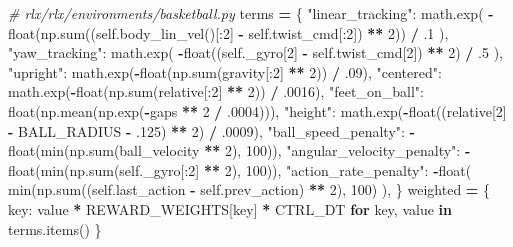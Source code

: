 \documentclass[
  american,
  11pt,
  letterpaper,
]{article}
\newenvironment{Shaded}{\begin{snugshade}}{\end{snugshade}}
\newcommand{\BuiltInTok}[1]{#1}
\newcommand{\CommentTok}[1]{\textcolor[rgb]{0.56,0.35,0.01}{\textit{#1}}}
\newcommand{\ControlFlowTok}[1]{\textcolor[rgb]{0.13,0.29,0.53}{\textbf{#1}}}
\newcommand{\DecValTok}[1]{\textcolor[rgb]{0.00,0.00,0.81}{#1}}
\newcommand{\FloatTok}[1]{\textcolor[rgb]{0.00,0.00,0.81}{#1}}
\newcommand{\KeywordTok}[1]{\textcolor[rgb]{0.13,0.29,0.53}{\textbf{#1}}}
\newcommand{\NormalTok}[1]{#1}
\newcommand{\OperatorTok}[1]{\textcolor[rgb]{0.81,0.36,0.00}{\textbf{#1}}}
\newcommand{\StringTok}[1]{\textcolor[rgb]{0.31,0.60,0.02}{#1}}
\newcommand{\VariableTok}[1]{\textcolor[rgb]{0.00,0.00,0.00}{#1}}
\renewenvironment{Shaded}{\par\smallskip}{\par\smallskip}
\begin{document}
\begin{Shaded}
\begin{Highlighting}[]
\CommentTok{\# rlx/rlx/environments/basketball.py}
\NormalTok{terms }\OperatorTok{=}\NormalTok{ \{}
    \StringTok{"linear\_tracking"}\NormalTok{: math.exp(}
        \OperatorTok{{-}}\BuiltInTok{float}\NormalTok{(np.}\BuiltInTok{sum}\NormalTok{((}\VariableTok{self}\NormalTok{.body\_lin\_vel()[:}\DecValTok{2}\NormalTok{] }\OperatorTok{{-}} \VariableTok{self}\NormalTok{.twist\_cmd[:}\DecValTok{2}\NormalTok{]) }\OperatorTok{**} \DecValTok{2}\NormalTok{)) }\OperatorTok{/} \FloatTok{.1}
\NormalTok{    ),}
    \StringTok{"yaw\_tracking"}\NormalTok{: math.exp(}
        \OperatorTok{{-}}\BuiltInTok{float}\NormalTok{((}\VariableTok{self}\NormalTok{.\_gyro[}\DecValTok{2}\NormalTok{] }\OperatorTok{{-}} \VariableTok{self}\NormalTok{.twist\_cmd[}\DecValTok{2}\NormalTok{]) }\OperatorTok{**} \DecValTok{2}\NormalTok{) }\OperatorTok{/} \FloatTok{.5}
\NormalTok{    ),}
    \StringTok{"upright"}\NormalTok{: math.exp(}\OperatorTok{{-}}\BuiltInTok{float}\NormalTok{(np.}\BuiltInTok{sum}\NormalTok{(gravity[:}\DecValTok{2}\NormalTok{] }\OperatorTok{**} \DecValTok{2}\NormalTok{)) }\OperatorTok{/} \FloatTok{.09}\NormalTok{),}
    \StringTok{"centered"}\NormalTok{: math.exp(}\OperatorTok{{-}}\BuiltInTok{float}\NormalTok{(np.}\BuiltInTok{sum}\NormalTok{(relative[:}\DecValTok{2}\NormalTok{] }\OperatorTok{**} \DecValTok{2}\NormalTok{)) }\OperatorTok{/} \FloatTok{.0016}\NormalTok{),}
    \StringTok{"feet\_on\_ball"}\NormalTok{: }\BuiltInTok{float}\NormalTok{(np.mean(np.exp(}\OperatorTok{{-}}\NormalTok{gaps }\OperatorTok{**} \DecValTok{2} \OperatorTok{/} \FloatTok{.0004}\NormalTok{))),}
    \StringTok{"height"}\NormalTok{: math.exp(}\OperatorTok{{-}}\BuiltInTok{float}\NormalTok{((relative[}\DecValTok{2}\NormalTok{] }\OperatorTok{{-}}\NormalTok{ BALL\_RADIUS }\OperatorTok{{-}} \FloatTok{.125}\NormalTok{) }\OperatorTok{**} \DecValTok{2}\NormalTok{) }\OperatorTok{/} \FloatTok{.0009}\NormalTok{),}
    \StringTok{"ball\_speed\_penalty"}\NormalTok{: }\OperatorTok{{-}}\BuiltInTok{float}\NormalTok{(}\BuiltInTok{min}\NormalTok{(np.}\BuiltInTok{sum}\NormalTok{(ball\_velocity }\OperatorTok{**} \DecValTok{2}\NormalTok{), }\DecValTok{100}\NormalTok{)),}
    \StringTok{"angular\_velocity\_penalty"}\NormalTok{: }\OperatorTok{{-}}\BuiltInTok{float}\NormalTok{(}\BuiltInTok{min}\NormalTok{(np.}\BuiltInTok{sum}\NormalTok{(}\VariableTok{self}\NormalTok{.\_gyro[:}\DecValTok{2}\NormalTok{] }\OperatorTok{**} \DecValTok{2}\NormalTok{), }\DecValTok{100}\NormalTok{)),}
    \StringTok{"action\_rate\_penalty"}\NormalTok{: }\OperatorTok{{-}}\BuiltInTok{float}\NormalTok{(}
        \BuiltInTok{min}\NormalTok{(np.}\BuiltInTok{sum}\NormalTok{((}\VariableTok{self}\NormalTok{.last\_action }\OperatorTok{{-}} \VariableTok{self}\NormalTok{.prev\_action) }\OperatorTok{**} \DecValTok{2}\NormalTok{), }\DecValTok{100}\NormalTok{)}
\NormalTok{    ),}
\NormalTok{\}}
\NormalTok{weighted }\OperatorTok{=}\NormalTok{ \{}
\NormalTok{    key: value }\OperatorTok{*}\NormalTok{ REWARD\_WEIGHTS[key] }\OperatorTok{*}\NormalTok{ CTRL\_DT}
    \ControlFlowTok{for}\NormalTok{ key, value }\KeywordTok{in}\NormalTok{ terms.items()}
\NormalTok{\}}
\end{Highlighting}
\end{Shaded}
\end{document}
